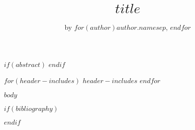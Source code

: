 \title{$title$}
\author{by $for(author)$$author.name$$sep$, $endfor$}

\maketitle

$if(abstract)$
$endif$

$for(header-includes)$
$header-includes$
$endfor$

$body$

$if(bibliography)$

$endif$
